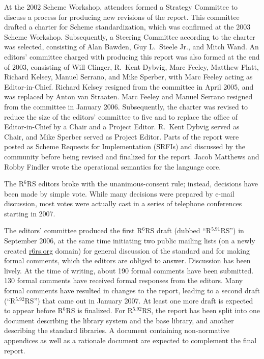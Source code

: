 \documentclass{sigplanconf}
\newcommand{\rn}[1]{R$^{#1}$RS}
\begin{document}
At the 2002 Scheme Workshop, attendees formed a Strategy Committee to
discuss a process for producing new revisions of the report.  This
committee drafted a charter for Scheme standardization, which was
confirmed at the 2003 Scheme Workshop.  Subsequently, a Steering
Committee according to the charter was selected, consisting of Alan
Bawden, Guy L.\ Steele Jr., and Mitch Wand.  An editors' committee
charged with producing this report was also formed at the end of 2003,
consisting of Will Clinger, R.\ Kent Dybvig, Marc Feeley, Matthew
Flatt, Richard Kelsey, Manuel Serrano, and Mike Sperber, with Marc
Feeley acting as Editor-in-Chief.  Richard Kelsey resigned from the
committee in April 2005, and was replaced by Anton van Straaten.  Marc
Feeley and Manuel Serrano resigned from the committee in January 2006.
Subsequently, the charter was revised to reduce the size of the
editors' committee to five and to replace the office of
Editor-in-Chief by a Chair and a Project Editor.  R.\ Kent Dybvig
served as Chair, and Mike Sperber served as Project Editor.  Parts of
the report were posted as Scheme Requests for Implementation (SRFIs)
and discussed by the community before being revised and finalized for
the report.  Jacob Matthews and Robby Findler wrote the operational
semantics for the language core.

The \rn{6} editors broke with the unanimous-consent rule; instead,
decisions have been made by simple vote.  While many decisions were
prepared by e-mail discussion, most votes were actually cast in a
series of telephone conferences starting in 2007.

The editors' committee produced the first \rn{6} draft (dubbed
``\rn{5.91}'') in September 2006, at the same time initiating two
public mailing lists (on a newly created \url{r6rs.org} domain) for general
discussion of the standard and for making formal comments, which the
editors are obliged to answer.  Discussion has been lively.  At the
time of writing, about 190 formal comments have been submitted.  130
formal comments have received formal responses from the editors.  Many
formal comments have resulted in changes to the report, leading to a
second draft (``\rn{5.92}'') that came out in January 2007.  At least one
more draft is expected to appear before \rn{6} is finalized.  For
\rn{5.92}, the report has been split into one document describing the
library system and the base library, and another describing the
standard libraries.  A document containing non-normative appendices as
well as a rationale document are expected to complement the final
report.
\end{document}
